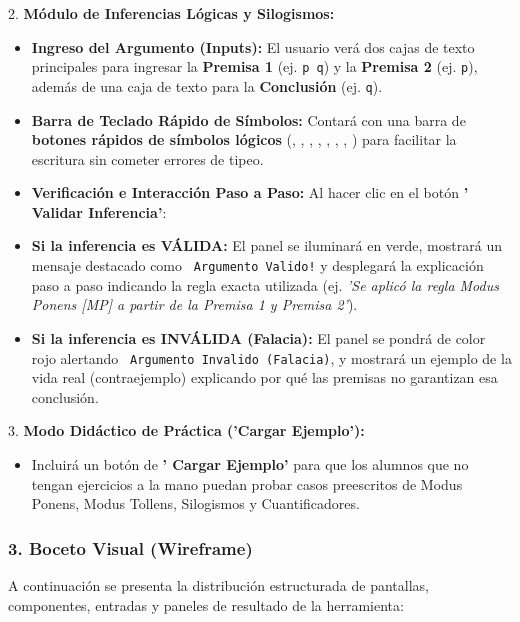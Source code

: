 \documentclass[11pt,a4paper,openany]{book}
\begin{document}
2. \textbf{Módulo de Inferencias Lógicas y Silogismos:}
\begin{itemize}[leftmargin=*]
\item \textbf{Ingreso del Argumento (Inputs):} El usuario verá dos cajas de texto principales para ingresar la \textbf{Premisa 1} (ej. \texttt{p  q}) y la \textbf{Premisa 2} (ej. \texttt{p}), además de una caja de texto para la \textbf{Conclusión} (ej. \texttt{q}).
\item \textbf{Barra de Teclado Rápido de Símbolos:} Contará con una barra de \textbf{botones rápidos de símbolos lógicos} (\texttt{}, \texttt{}, \texttt{}, \texttt{}, \texttt{}, \texttt{}, \texttt{}, \texttt{}) para facilitar la escritura sin cometer errores de tipeo.
\item \textbf{Verificación e Interacción Paso a Paso:} Al hacer clic en el botón \textbf{' Validar Inferencia'}:
\item \textbf{Si la inferencia es VÁLIDA:} El panel se iluminará en verde, mostrará un mensaje destacado como \texttt{ Argumento Valido!} y desplegará la explicación paso a paso indicando la regla exacta utilizada (ej. \textit{'Se aplicó la regla Modus Ponens [MP] a partir de la Premisa 1 y Premisa 2'}).
\item \textbf{Si la inferencia es INVÁLIDA (Falacia):} El panel se pondrá de color rojo alertando \texttt{ Argumento Invalido (Falacia)}, y mostrará un ejemplo de la vida real (contraejemplo) explicando por qué las premisas no garantizan esa conclusión.
\end{itemize}

3. \textbf{Modo Didáctico de Práctica ('Cargar Ejemplo'):}
\begin{itemize}[leftmargin=*]
\item Incluirá un botón de \textbf{' Cargar Ejemplo'} para que los alumnos que no tengan ejercicios a la mano puedan probar casos preescritos de Modus Ponens, Modus Tollens, Silogismos y Cuantificadores.
\end{itemize}

\hrulefill

\subsubsection{3. Boceto Visual (Wireframe)}

A continuación se presenta la distribución estructurada de pantallas, componentes, entradas y paneles de resultado de la herramienta:
\end{document}
